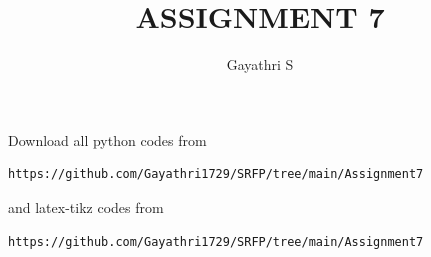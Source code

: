\documentclass[journal,12pt,twocolumn]{IEEEtran}
\begin{document}
%


\newtheorem{theorem}{Theorem}[section]
\newtheorem{problem}{Problem}
\newtheorem{proposition}{Proposition}[section]
\newtheorem{lemma}{Lemma}[section]
\newtheorem{corollary}[theorem]{Corollary}
\newtheorem{example}{Example}[section]
\newtheorem{definition}[problem]{Definition}
\newcommand{\BEQA}{\begin{eqnarray}}
\newcommand{\EEQA}{\end{eqnarray}}
\newcommand{\define}{\stackrel{\triangle}{=}}

\providecommand{\mbf}{\mathbf}
\providecommand{\pr}[1]{\ensuremath{\Pr\left(#1\right)}}
\providecommand{\qfunc}[1]{\ensuremath{Q\left(#1\right)}}
\providecommand{\sbrak}[1]{\ensuremath{{}\left[#1\right]}}
\providecommand{\lsbrak}[1]{\ensuremath{{}\left[#1\right.}}
\providecommand{\rsbrak}[1]{\ensuremath{{}\left.#1\right]}}
\providecommand{\brak}[1]{\ensuremath{\left(#1\right)}}
\providecommand{\lbrak}[1]{\ensuremath{\left(#1\right.}}
\providecommand{\rbrak}[1]{\ensuremath{\left.#1\right)}}
\providecommand{\cbrak}[1]{\ensuremath{\left\{#1\right\}}}
\providecommand{\lcbrak}[1]{\ensuremath{\left\{#1\right.}}
\providecommand{\rcbrak}[1]{\ensuremath{\left.#1\right\}}}
\theoremstyle{remark}
\newtheorem{rem}{Remark}
\newcommand{\sgn}{\mathop{\mathrm{sgn}}}
\providecommand{\abs}[1]{\left\vert#1\right\vert}
\providecommand{\res}[1]{\Res\displaylimits_{#1}} 
\providecommand{\norm}[1]{\left\lVert#1\right\rVert}
\providecommand{\mtx}[1]{\mathbf{#1}}
\providecommand{\mean}[1]{E\left[ #1 \right]}
\providecommand{\fourier}{\overset{\mathcal{F}}{ \rightleftharpoons}}
\providecommand{\system}{\overset{\mathcal{H}}{ \longleftrightarrow}}


\newcommand{\myvec}[1]{\ensuremath{\begin{pmatrix}#1\end{pmatrix}}}
\newcommand{\cmyvec}[1]{\ensuremath{\begin{pmatrix*}[c]#1\end{pmatrix*}}}
\newcommand{\mydet}[1]{\ensuremath{\begin{vmatrix}#1\end{vmatrix}}}
\newcommand{\proj}[2]{\textbf{proj}_{\vec{#1}}\vec{#2}}
\let\StandardTheFigure\thefigure
\let\vec\mathbf
\title{
ASSIGNMENT 7
}
\author{Gayathri S}
	

\maketitle
\renewcommand{\thefigure}{\theenumi}
\renewcommand{\thetable}{\theenumi}
  Download all python codes from 
\begin{lstlisting}
https://github.com/Gayathri1729/SRFP/tree/main/Assignment7
\end{lstlisting}
%
and latex-tikz codes from 
%
\begin{lstlisting}
https://github.com/Gayathri1729/SRFP/tree/main/Assignment7
\end{lstlisting}
%
\end{document}
